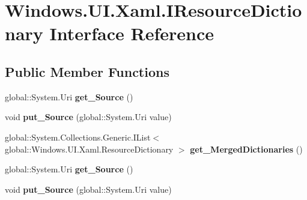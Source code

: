 \hypertarget{interface_windows_1_1_u_i_1_1_xaml_1_1_i_resource_dictionary}{}\section{Windows.\+U\+I.\+Xaml.\+I\+Resource\+Dictionary Interface Reference}
\label{interface_windows_1_1_u_i_1_1_xaml_1_1_i_resource_dictionary}
\subsection*{Public Member Functions}
\begin{DoxyCompactItemize}
\item 
\mbox{\label{interface_windows_1_1_u_i_1_1_xaml_1_1_i_resource_dictionary_a76dcde97b7d0bf8406589caca8feef64}} 
global\+::\+System.\+Uri {\bfseries get\+\_\+\+Source} ()
\item 
\mbox{\label{interface_windows_1_1_u_i_1_1_xaml_1_1_i_resource_dictionary_a8d5669e35c8e6ad0622049bf239bc760}} 
void {\bfseries put\+\_\+\+Source} (global\+::\+System.\+Uri value)
\item 
\mbox{\label{interface_windows_1_1_u_i_1_1_xaml_1_1_i_resource_dictionary_a5bfd581ecb0bf11f53eb2e228d657388}} 
global\+::\+System.\+Collections.\+Generic.\+I\+List$<$ global\+::\+Windows.\+U\+I.\+Xaml.\+Resource\+Dictionary $>$ {\bfseries get\+\_\+\+Merged\+Dictionaries} ()
\item 
\mbox{\label{interface_windows_1_1_u_i_1_1_xaml_1_1_i_resource_dictionary_a76dcde97b7d0bf8406589caca8feef64}} 
global\+::\+System.\+Uri {\bfseries get\+\_\+\+Source} ()
\item 
\mbox{\label{interface_windows_1_1_u_i_1_1_xaml_1_1_i_resource_dictionary_a8d5669e35c8e6ad0622049bf239bc760}} 
void {\bfseries put\+\_\+\+Source} (global\+::\+System.\+Uri value)
\item 
\mbox{\label{interface_windows_1_1_u_i_1_1_xaml_1_1_i_resource_dictionary_a5bfd581ecb0bf11f53eb2e228d657388}} 

\end{DoxyCompactItemize}
